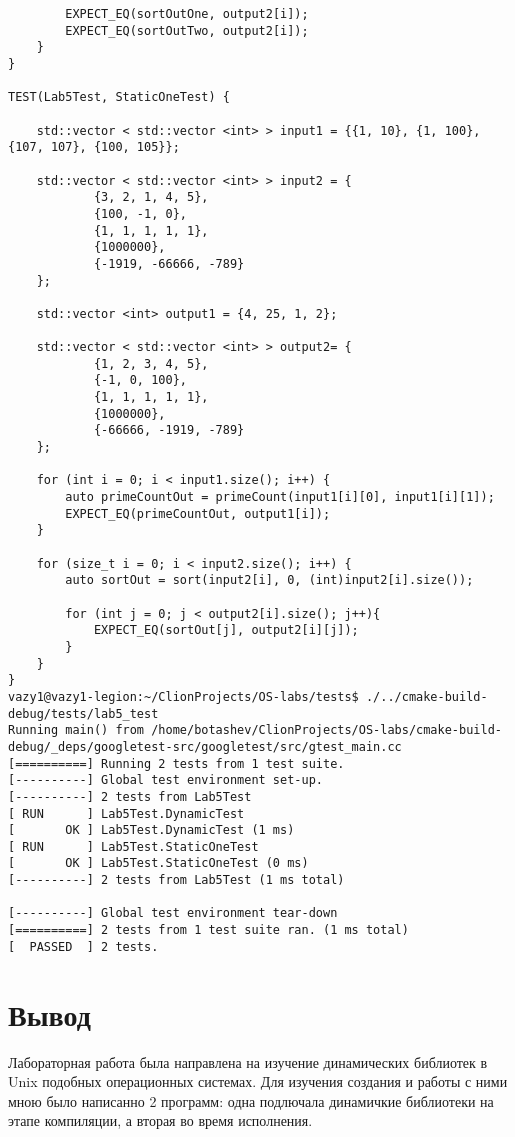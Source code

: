 \documentclass[pdf, unicode, 12pt, a4paper,oneside,fleqn]{article}
\begin{document}
{\begin{verbatim}
        EXPECT_EQ(sortOutOne, output2[i]);
        EXPECT_EQ(sortOutTwo, output2[i]);
    }
}

TEST(Lab5Test, StaticOneTest) {

    std::vector < std::vector <int> > input1 = {{1, 10}, {1, 100}, {107, 107}, {100, 105}};

    std::vector < std::vector <int> > input2 = {
            {3, 2, 1, 4, 5},
            {100, -1, 0},
            {1, 1, 1, 1, 1},
            {1000000},
            {-1919, -66666, -789}
    };

    std::vector <int> output1 = {4, 25, 1, 2};

    std::vector < std::vector <int> > output2= {
            {1, 2, 3, 4, 5},
            {-1, 0, 100},
            {1, 1, 1, 1, 1},
            {1000000},
            {-66666, -1919, -789}
    };

    for (int i = 0; i < input1.size(); i++) {
        auto primeCountOut = primeCount(input1[i][0], input1[i][1]);
        EXPECT_EQ(primeCountOut, output1[i]);
    }

    for (size_t i = 0; i < input2.size(); i++) {
        auto sortOut = sort(input2[i], 0, (int)input2[i].size());

        for (int j = 0; j < output2[i].size(); j++){
            EXPECT_EQ(sortOut[j], output2[i][j]);
        }
    }
}
vazy1@vazy1-legion:~/ClionProjects/OS-labs/tests$ ./../cmake-build-debug/tests/lab5_test 
Running main() from /home/botashev/ClionProjects/OS-labs/cmake-build-debug/_deps/googletest-src/googletest/src/gtest_main.cc
[==========] Running 2 tests from 1 test suite.
[----------] Global test environment set-up.
[----------] 2 tests from Lab5Test
[ RUN      ] Lab5Test.DynamicTest
[       OK ] Lab5Test.DynamicTest (1 ms)
[ RUN      ] Lab5Test.StaticOneTest
[       OK ] Lab5Test.StaticOneTest (0 ms)
[----------] 2 tests from Lab5Test (1 ms total)

[----------] Global test environment tear-down
[==========] 2 tests from 1 test suite ran. (1 ms total)
[  PASSED  ] 2 tests.
\end{verbatim}
}

\pagebreak

\section{Вывод}

Лабораторная работа была направлена на изучение динамических библиотек в Unix подобных операционных
системах. Для изучения создания и работы с ними мною было написанно 2 программ: одна
подлючала динамичкие библиотеки на этапе компиляции, а вторая во время исполнения.
\end{document}
